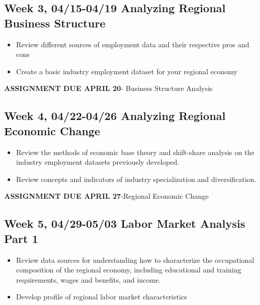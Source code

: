 \documentclass[11pt,]{article}
\providecommand{\tightlist}{%
  \setlength{\itemsep}{0pt}\setlength{\parskip}{0pt}}
\begin{document}
\hypertarget{week-3-0415-0419-analyzing-regional-business-structure}{%
\subsection{Week 3, 04/15-04/19 Analyzing Regional Business
Structure}\label{week-3-0415-0419-analyzing-regional-business-structure}}

\begin{itemize}
\tightlist
\item
  Review different sources of employment data and their respective pros
  and cons
\item
  Create a basic industry employment dataset for your regional economy
\end{itemize}

\textbf{ASSIGNMENT DUE APRIL 20}- Business Structure Analysis

\hypertarget{week-4-0422-0426-analyzing-regional-economic-change}{%
\subsection{Week 4, 04/22-04/26 Analyzing Regional Economic
Change}\label{week-4-0422-0426-analyzing-regional-economic-change}}

\begin{itemize}
\item
  Review the methods of economic base theory and shift-share analysis on
  the industry employment datasets previously developed.
\item
  Review concepts and indicators of industry specialization and
  diversification.
\end{itemize}

\textbf{ASSIGNMENT DUE APRIL 27}-Regional Economic Change

\hypertarget{week-5-0429-0503-labor-market-analysis-part-1}{%
\subsection{Week 5, 04/29-05/03 Labor Market Analysis Part
1}\label{week-5-0429-0503-labor-market-analysis-part-1}}

\begin{itemize}
\item
  Review data sources for understanding how to characterize the
  occupational composition of the regional economy, including
  educational and training requirements, wages and benefits, and income.
\item
  Develop profile of regional labor market characteristics
\end{itemize}
\end{document}
